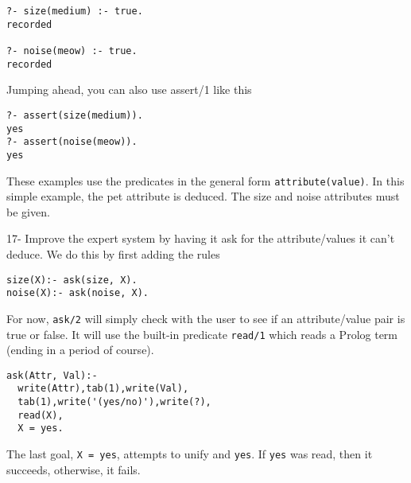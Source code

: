 \begin{verbatim}
?- size(medium) :- true.
recorded

?- noise(meow) :- true.
recorded
\end{verbatim}

Jumping ahead, you can also use assert/1 like this

\begin{verbatim}
?- assert(size(medium)).
yes
?- assert(noise(meow)).
yes
\end{verbatim}

These examples use the predicates in the general form \verb'attribute(value)'.
In this simple example, the pet attribute is deduced. The size and noise
attributes must be given.

17- Improve the expert system by having it ask for the attribute/values it can't
deduce. We do this by first adding the rules

\begin{verbatim}
size(X):- ask(size, X).
noise(X):- ask(noise, X).
\end{verbatim}
For now, \verb'ask/2' will simply check with the user to see if an
attribute/value pair is true or false. It will use the built-in predicate
\verb'read/1' which reads a Prolog term (ending in a period of course).

\begin{verbatim}
ask(Attr, Val):-
  write(Attr),tab(1),write(Val),
  tab(1),write('(yes/no)'),write(?),
  read(X),
  X = yes.
\end{verbatim}
The last goal, \verb'X = yes', attempts to unify  and \verb'yes'. If
\verb'yes' was read, then it succeeds, otherwise, it fails.

\secup

\secup